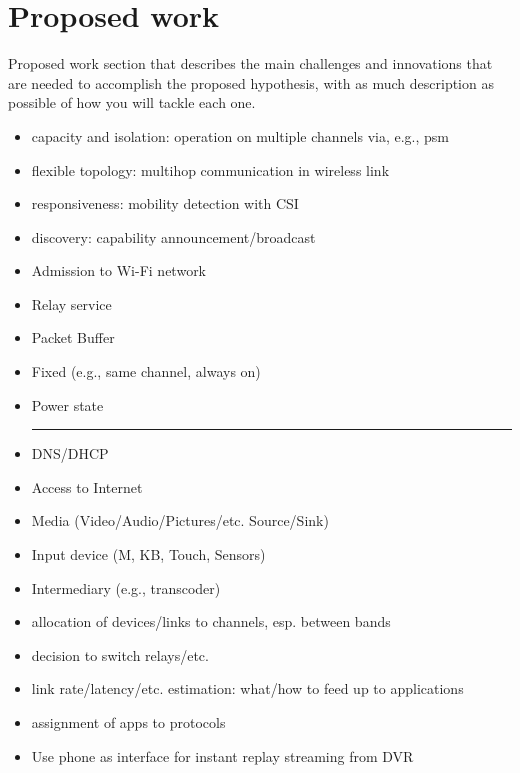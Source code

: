 \section{Proposed work}
Proposed work section that describes the main challenges and
innovations that are needed to accomplish the proposed hypothesis, with
as much description as possible of how you will tackle each one.

\begin{itemize}
\item capacity and isolation: operation on multiple channels via, e.g., psm
\item flexible topology: multihop communication in wireless link
\item responsiveness: mobility detection with CSI
\item discovery: capability announcement/broadcast
\end{itemize}

\begin{itemize}
\item Admission to Wi-Fi network
\item Relay service
\item Packet Buffer
\item Fixed (e.g., same channel, always on)
\item Power state\\
\hrule
\item DNS/DHCP
\item Access to Internet
\item Media (Video/Audio/Pictures/etc. Source/Sink)
\item Input device (M, KB, Touch, Sensors)
\item Intermediary (e.g., transcoder)
\end{itemize}

\begin{itemize}
\item allocation of devices/links to channels, esp. between bands
\item decision to switch relays/etc.
\item link rate/latency/etc. estimation: what/how to feed up to applications
\item assignment of apps to protocols
\end{itemize}

\begin{itemize}
\item Use phone as interface for instant replay streaming from DVR
\end{itemize}